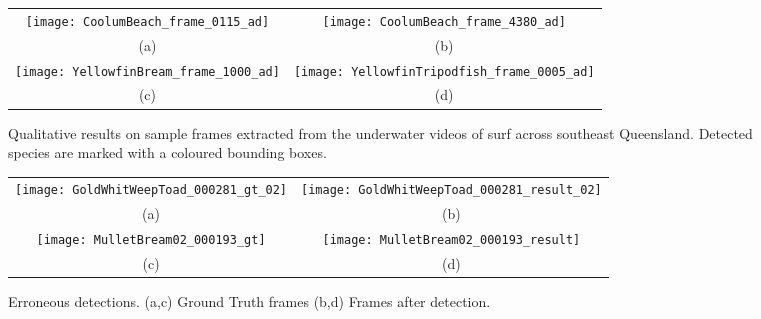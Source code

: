 \documentclass[conference]{IEEEtran}       %
\begin{document}
\begin{figure*}[!htb]
   \centering
   \begin{tabular}{cc}
        \texttt{[image: CoolumBeach\_frame\_0115\_ad]}&
        \texttt{[image: CoolumBeach\_frame\_4380\_ad]}\\
        (a) & (b)\\
        \texttt{[image: YellowfinBream\_frame\_1000\_ad]}&
        \texttt{[image: YellowfinTripodfish\_frame\_0005\_ad]}\\
           (c) & (d)\\
   \end{tabular}  \vspace{-2ex}
   \caption{Qualitative results on sample frames extracted from the underwater videos of  surf across southeast Queensland. Detected species are marked with a coloured bounding boxes.}
   \label{fig:FramedetectionResults}
   \vspace{-2ex}
\end{figure*}
\begin{figure*}[!htb]
   \centering
   \begin{tabular}{cc}
        \texttt{[image: GoldWhitWeepToad\_000281\_gt\_02]}&
        \texttt{[image: GoldWhitWeepToad\_000281\_result\_02]}\\
        (a) & (b)\\
        \texttt{[image: MulletBream02\_000193\_gt]}&
        \texttt{[image: MulletBream02\_000193\_result]}\\
        (c) & (d)\\
   \end{tabular}  \vspace{-1ex}
   \caption{Erroneous detections. (a,c) Ground Truth frames (b,d) Frames after detection.}
\label{fig:FramedetectionError}
\vspace{-3ex}
\end{figure*}
\end{document}
